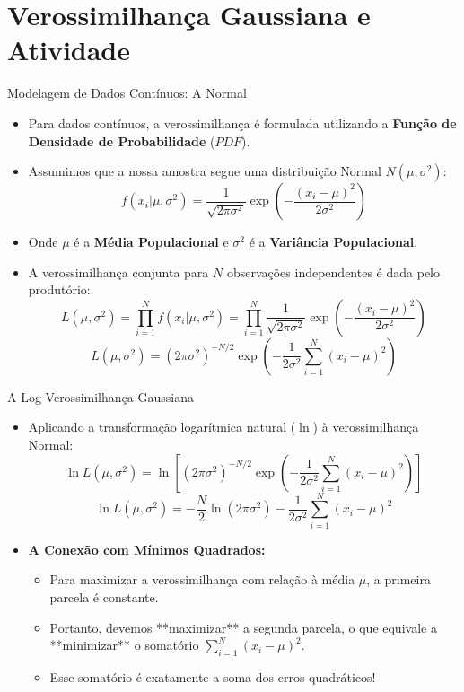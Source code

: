 \section{Verossimilhança Gaussiana e Atividade}

\begin{frame}{Modelagem de Dados Contínuos: A Normal}
    \begin{itemize}
        \item Para dados contínuos, a verossimilhança é formulada utilizando a \textbf{Função de Densidade de Probabilidade} ($PDF$).
        \item Assumimos que a nossa amostra segue uma distribuição Normal $N(\mu, \sigma^2)$:
        $$f(x_i | \mu, \sigma^2) = \frac{1}{\sqrt{2\pi\sigma^2}} \exp\left(-\frac{(x_i - \mu)^2}{2\sigma^2}\right)$$
        \item Onde $\mu$ é a \textbf{Média Populacional} e $\sigma^2$ é a \textbf{Variância Populacional}.
        \item A verossimilhança conjunta para $N$ observações independentes é dada pelo produtório:
        $$L(\mu, \sigma^2) = \prod_{i=1}^N f(x_i | \mu, \sigma^2) = \prod_{i=1}^N \frac{1}{\sqrt{2\pi\sigma^2}} \exp\left(-\frac{(x_i - \mu)^2}{2\sigma^2}\right)$$
        $$L(\mu, \sigma^2) = \left(2\pi\sigma^2\right)^{-N/2} \exp\left(-\frac{1}{2\sigma^2} \sum_{i=1}^N (x_i - \mu)^2\right)$$
    \end{itemize}
\end{frame}

\begin{frame}{A Log-Verossimilhança Gaussiana}
    \begin{itemize}
        \item Aplicando a transformação logarítmica natural ($\ln$) à verossimilhança Normal:
        $$\ln L(\mu, \sigma^2) = \ln \left[ \left(2\pi\sigma^2\right)^{-N/2} \exp\left(-\frac{1}{2\sigma^2} \sum_{i=1}^N (x_i - \mu)^2\right) \right]$$
        $$\ln L(\mu, \sigma^2) = -\frac{N}{2} \ln(2\pi\sigma^2) - \frac{1}{2\sigma^2} \sum_{i=1}^N (x_i - \mu)^2$$
        \item \textbf{A Conexão com Mínimos Quadrados:}
        \begin{itemize}
            \item Para maximizar a verossimilhança com relação à média $\mu$, a primeira parcela é constante.
            \item Portanto, devemos **maximizar** a segunda parcela, o que equivale a **minimizar** o somatório $\sum_{i=1}^N (x_i - \mu)^2$.
            \item Esse somatório é exatamente a soma dos erros quadráticos!
        \end{itemize}
    \end{itemize}
\end{frame}

